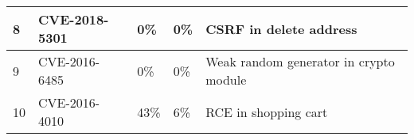 \begin{table}[]
\begin{adjustbox}{max width=0.65\textwidth}
\begin{tabular}{|lllll|}
    \multicolumn{1}{|l|}{8}           & \multicolumn{1}{l|}{CVE-2018-5301}   & \multicolumn{1}{l|}{0\%}                   & \multicolumn{1}{l|}{0\%}               & CSRF in delete address                   \\ \hline
    \multicolumn{1}{|l|}{9}           & \multicolumn{1}{l|}{CVE-2016-6485}   & \multicolumn{1}{l|}{0\%}                   & \multicolumn{1}{l|}{0\%}               & Weak random generator in crypto module   \\ \hline
    \multicolumn{1}{|l|}{10}          & \multicolumn{1}{l|}{CVE-2016-4010}   & \multicolumn{1}{l|}{43\%}                  & \multicolumn{1}{l|}{6\%}               & RCE in shopping cart                     \\ \hline
    \end{tabular}
    \end{adjustbox}
    \end{table}

